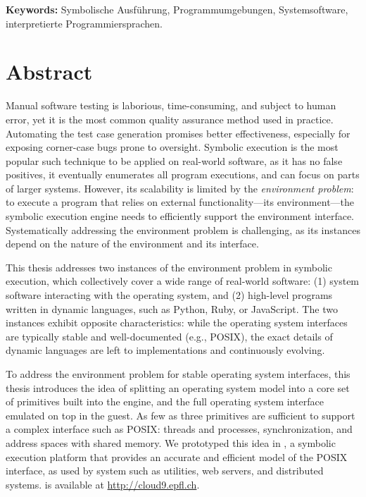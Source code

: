 \noindent \textbf{Keywords:} Symbolische Ausführung, Programmumgebungen, Systemsoftware, interpretierte Programmiersprachen.

\chapter*{Abstract}

Manual software testing is laborious, time-consuming, and subject to human error, yet it is the most common quality assurance method used in practice.
%
Automating the test case generation promises better effectiveness, especially for exposing corner-case bugs prone to oversight.
%
Symbolic execution is the most popular such technique to be applied on real-world software, as it has no false positives, it eventually enumerates all program executions, and can focus on parts of larger systems.
%
However, its scalability is limited by the \emph{environment problem}: to execute a program that relies on external functionality---its environment---the symbolic execution engine needs to efficiently support the environment interface.
%
Systematically addressing the environment problem is challenging, as its instances depend on the nature of the environment and its interface.

This thesis addresses two instances of the environment problem in symbolic execution, which collectively cover a wide range of real-world software: (1) system software interacting with the operating system, and (2) high-level programs written in dynamic languages, such as Python, Ruby, or JavaScript.
%
The two instances exhibit opposite characteristics: while the operating system interfaces are typically stable and well-documented (e.g., POSIX), the exact details of dynamic languages are left to implementations and continuously evolving.

To address the environment problem for stable operating system interfaces, this thesis introduces the idea of splitting an operating system model into a core set of primitives built into the engine, and the full operating system interface emulated on top in the guest.
%
As few as three primitives are sufficient to support a complex interface such as POSIX: threads and processes, synchronization, and address spaces with shared memory.
%
We prototyped this idea in \emph{\cnine}, a symbolic execution platform that provides an accurate and efficient model of the POSIX interface, as used by system such as utilities, web servers, and distributed systems.
%
\cnine is available at {\url{http://cloud9.epfl.ch}}.

